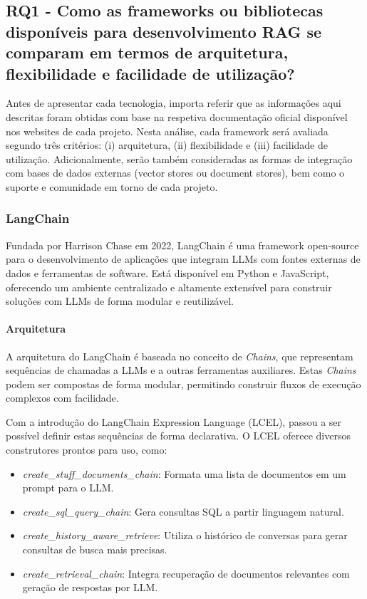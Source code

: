 \subsection{RQ1 - Como as frameworks ou bibliotecas disponíveis para desenvolvimento RAG se comparam em termos de arquitetura, flexibilidade e facilidade de utilização?}

Antes de apresentar cada tecnologia, importa referir que as informações aqui descritas foram obtidas com base na respetiva documentação oficial disponível nos websites de cada projeto. Nesta análise, cada framework será avaliada segundo três critérios: (i) arquitetura, (ii) flexibilidade e (iii) facilidade de utilização. Adicionalmente, serão também consideradas as formas de integração com bases de dados externas (vector stores ou document stores), bem como o suporte e comunidade em torno de cada projeto.


\subsubsection{LangChain}


Fundada por Harrison Chase em 2022, LangChain é uma framework open-source para o desenvolvimento de aplicações que integram LLMs com fontes externas de dados e ferramentas de software. Está disponível em Python e JavaScript, oferecendo um ambiente centralizado e altamente extensível para construir soluções com LLMs de forma modular e reutilizável.

\paragraph{Arquitetura}

A arquitetura do LangChain é baseada no conceito de \textit{Chains}, que representam sequências de chamadas a LLMs e a outras ferramentas auxiliares. Estas \textit{Chains} podem ser compostas de forma modular, permitindo construir fluxos de execução complexos com facilidade.

Com a introdução do LangChain Expression Language (LCEL), passou a ser possível definir estas sequências de forma declarativa. O LCEL oferece diversos construtores prontos para uso, como:

\begin{itemize}
	\item \textit{create\_stuff\_documents\_chain}: Formata uma lista de documentos em um prompt para o LLM.
	\item \textit{create\_sql\_query\_chain}: Gera consultas SQL a partir linguagem natural.
	\item \textit{create\_history\_aware\_retrieve}: Utiliza o histórico de conversas para gerar consultas de busca mais precisas.
	\item \textit{create\_retrieval\_chain}: Integra recuperação de documentos relevantes com geração de respostas por LLM.
\end{itemize}


